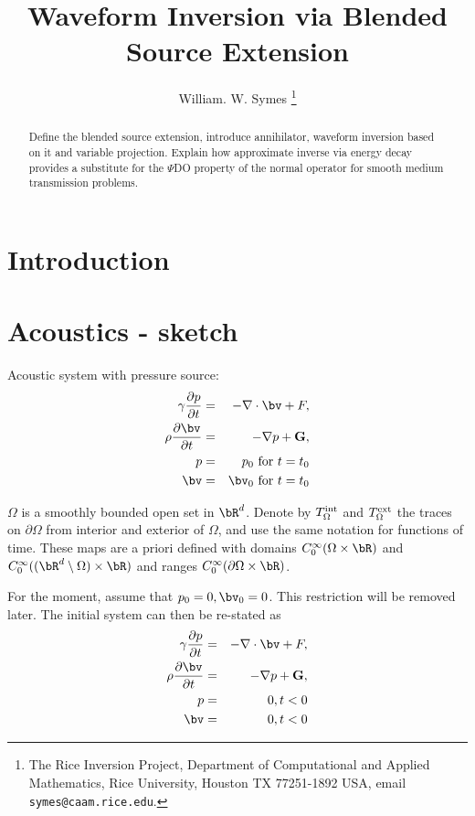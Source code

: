 \title{Waveform Inversion via Blended Source Extension}
\author{William. W. Symes \thanks{The Rice Inversion Project,
Department of Computational and Applied Mathematics, Rice University,
Houston TX 77251-1892 USA, email {\tt symes@caam.rice.edu}.}}



\maketitle
\begin{abstract}
Define the blended source extension, introduce annihilator, waveform inversion based on it
and variable projection.
Explain how approximate inverse via energy decay  provides a
substitute for the $\Psi$DO property of the normal operator for smooth
medium transmission problems.
\end{abstract}
\section{Introduction}
\section{Acoustics - sketch}
Acoustic system with pressure source:
\begin{eqnarray}
\label{eqn:awe}
\gamma \frac{\partial p}{\partial t} & = & - \nabla \cdot \bv +
F, \nonumber \\
\rho \frac{\partial \bv}{\partial t} & = & - \nabla p + {\bf G},\nonumber \\
p & =& p_0 \mbox{ for } t= t_0\nonumber\\ 
\bv & = & \bv_0 \mbox{ for } t= t_0 
\end{eqnarray}

$\Omega$  is a smoothly bounded open set in $\bR^d$. Denote by
$T^{\rm int}_{\Omega}$ and $T^{\rm ext}_{\Omega}$ the traces on $\partial
\Omega$ from interior and exterior of $\Omega$, and use the same notation
for functions of time. These maps are a priori defined with domains
$C^{\infty}_0(\Omega \times \bR)$ and $C^{\infty}_0((\bR^d\setminus
\Omega) \times \bR)$ and ranges $C^{\infty}_0(\partial \Omega \times \bR)$.

For the moment, assume that $p_0=0, \bv_0=0$. This restriction will be
removed later. The initial system can then be re-stated as
\begin{eqnarray}
\label{eqn:ichom}
\gamma \frac{\partial p}{\partial t} & = & - \nabla \cdot \bv +
F, \nonumber \\
\rho \frac{\partial \bv}{\partial t} & = & - \nabla p + {\bf G},\nonumber \\
p & = & 0, t < 0\\
\bv & = & 0, t < 0 
\end{eqnarray}

